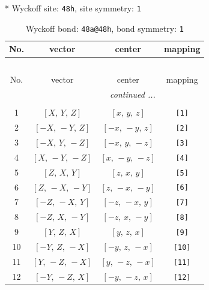 \documentclass[fleqn,8pt]{jsarticle}
\begin{document}
* Wyckoff site: {\tt 48h}, site symmetry: {\tt 1}
\renewcommand{\arraystretch}{1.2}
\begin{longtable}{cccc}
\caption{Wyckoff bond: {\tt 48a@48h}, bond symmetry: {\tt 1}}
 \\
 \hline \hline
No. & vector & center & mapping \\ \hline \endfirsthead

\multicolumn{3}{l}{\tablename\ \thetable{}} \\
 \hline \hline
No. & vector & center & mapping \\ \hline \endhead

 \hline \hline
\multicolumn{3}{r}{\footnotesize\it continued ...} \\ \endfoot

 \hline \hline
\multicolumn{3}{r}{} \\ \endlastfoot

1 & $\left[ X,\, Y,\, Z \right]$ & $\left[ x,\, y,\, z \right]$ & {\tt [1]} \\ \hline
2 & $\left[ - X,\, - Y,\, Z \right]$ & $\left[ - x,\, - y,\, z \right]$ & {\tt [2]} \\ \hline
3 & $\left[ - X,\, Y,\, - Z \right]$ & $\left[ - x,\, y,\, - z \right]$ & {\tt [3]} \\ \hline
4 & $\left[ X,\, - Y,\, - Z \right]$ & $\left[ x,\, - y,\, - z \right]$ & {\tt [4]} \\ \hline
5 & $\left[ Z,\, X,\, Y \right]$ & $\left[ z,\, x,\, y \right]$ & {\tt [5]} \\ \hline
6 & $\left[ Z,\, - X,\, - Y \right]$ & $\left[ z,\, - x,\, - y \right]$ & {\tt [6]} \\ \hline
7 & $\left[ - Z,\, - X,\, Y \right]$ & $\left[ - z,\, - x,\, y \right]$ & {\tt [7]} \\ \hline
8 & $\left[ - Z,\, X,\, - Y \right]$ & $\left[ - z,\, x,\, - y \right]$ & {\tt [8]} \\ \hline
9 & $\left[ Y,\, Z,\, X \right]$ & $\left[ y,\, z,\, x \right]$ & {\tt [9]} \\ \hline
10 & $\left[ - Y,\, Z,\, - X \right]$ & $\left[ - y,\, z,\, - x \right]$ & {\tt [10]} \\ \hline
11 & $\left[ Y,\, - Z,\, - X \right]$ & $\left[ y,\, - z,\, - x \right]$ & {\tt [11]} \\ \hline
12 & $\left[ - Y,\, - Z,\, X \right]$ & $\left[ - y,\, - z,\, x \right]$ & {\tt [12]} \\
\end{longtable}
\end{document}
